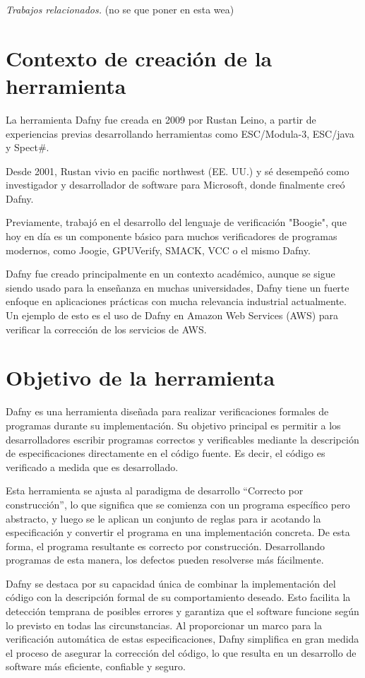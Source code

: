 \documentclass[runningheads]{llncs}
\begin{document}
\emph{Trabajos relacionados.} (no se que poner en esta wea)

\section{Contexto de creación de la herramienta}

La herramienta Dafny fue creada en 2009 por Rustan Leino,
a partir de experiencias previas desarrollando herramientas como ESC/Modula-3, ESC/java y Spect\#.

Desde 2001, Rustan vivio en pacific northwest (EE. UU.) y sé desempeñó como investigador y desarrollador de software para Microsoft,
donde finalmente creó Dafny.

Previamente, trabajó en el desarrollo del lenguaje de verificación "Boogie",
que hoy en día es un componente básico para muchos verificadores de programas modernos,
como Joogie, GPUVerify, SMACK, VCC o el mismo Dafny.    

Dafny fue creado principalmente en un contexto académico, 
aunque se sigue siendo usado para la enseñanza en muchas universidades, 
Dafny tiene un fuerte enfoque en aplicaciones prácticas con mucha relevancia industrial actualmente.
Un ejemplo de esto es el uso de Dafny en Amazon Web Services (AWS) para verificar la corrección de los servicios de AWS.

\section{Objetivo de la herramienta}

Dafny es una herramienta diseñada para realizar verificaciones formales de programas durante su implementación.
Su objetivo principal es permitir a los desarrolladores escribir programas correctos y verificables mediante la descripción
de especificaciones directamente en el código fuente. Es decir, el código es verificado a medida que es desarrollado.

Esta herramienta se ajusta al paradigma de desarrollo ``Correcto por construcción'', lo que significa que se comienza
con un programa específico pero abstracto, y luego se le aplican un conjunto de reglas para ir acotando la especificación
y convertir el programa en una implementación concreta. De esta forma, el programa resultante es correcto por construcción.
Desarrollando programas de esta manera, los defectos pueden resolverse más fácilmente.

Dafny se destaca por su capacidad única de combinar la implementación del código con la descripción formal de su comportamiento
deseado. Esto facilita la detección temprana de posibles errores y garantiza que el software funcione según lo previsto en todas
las circunstancias. Al proporcionar un marco para la verificación automática de estas especificaciones, Dafny simplifica en gran
medida el proceso de asegurar la corrección del código, lo que resulta en un desarrollo de software más eficiente, confiable y seguro.
\end{document}
